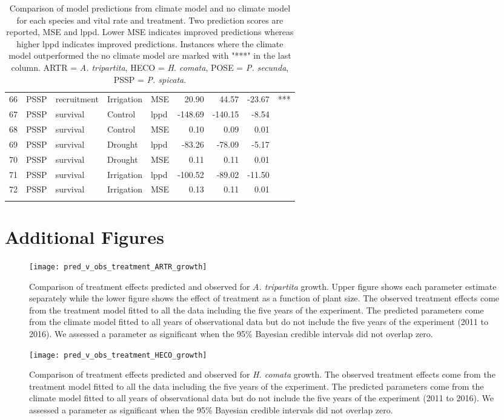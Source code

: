 \documentclass[11pt]{article}
\begin{document}
\begin{longtable}{rllllrrrl}
	66 & PSSP & recruitment & Irrigation & MSE & 20.90 & 44.57 & -23.67 & *** \\ 
	67 & PSSP & survival & Control & lppd & -148.69 & -140.15 & -8.54 &  \\ 
	68 & PSSP & survival & Control & MSE & 0.10 & 0.09 & 0.01 &  \\ 
	69 & PSSP & survival & Drought & lppd & -83.26 & -78.09 & -5.17 &  \\ 
	70 & PSSP & survival & Drought & MSE & 0.11 & 0.11 & 0.01 &  \\ 
	71 & PSSP & survival & Irrigation & lppd & -100.52 & -89.02 & -11.50 &  \\ 
	72 & PSSP & survival & Irrigation & MSE & 0.13 & 0.11 & 0.01 &  \\ 
	\hline
	\caption{Comparison of model predictions from climate model and no climate model for each species and vital rate and treatment.  Two prediction scores are reported, MSE and lppd. Lower MSE indicates improved predictions whereas higher lppd indicates improved predictions.  Instances where the climate model outperformed the no climate model are marked with "***" in the last column. ARTR = \textit{A. tripartita}, HECO = \textit{H. comata}, POSE = \textit{P. secunda}, PSSP = \textit{P. spicata}.} 
	\label{table:treatmentPreds}
\end{longtable}


\clearpage
\newpage
\clearpage
\newpage
\section{Additional Figures} 

\begin{figure}[!htbp]
	\centering
	\texttt{[image: pred\_v\_obs\_treatment\_ARTR\_growth]}
	\caption{Comparison of treatment effects predicted and observed for \textit{A. tripartita} growth.  Upper figure shows each parameter estimate separately while the lower figure shows the effect of treatment as a function of plant size.  The observed treatment effects come from the treatment model fitted to all the data including the five years of the experiment.  The predicted parameters come from the climate model fitted to all years of observational data but do not include the five years of the experiment (2011 to 2016). We assessed a parameter as significant when the 95\% Bayesian credible intervals did not overlap zero.}
	\label{fig:parPredARTRGrowth}
\end{figure}

\begin{figure}[!htbp]
	\centering
	\texttt{[image: pred\_v\_obs\_treatment\_HECO\_growth]}
	\caption{Comparison of treatment effects predicted and observed for \textit{H. comata} growth.  The observed treatment effects come from the treatment model fitted to all the data including the five years of the experiment.  The predicted parameters come from the climate model fitted to all years of observational data but do not include the five years of the experiment (2011 to 2016). We assessed a parameter as significant when the 95\% Bayesian credible intervals did not overlap zero.}
	\label{fig:parPredHECOGrowth}
\end{figure}
\end{document}
